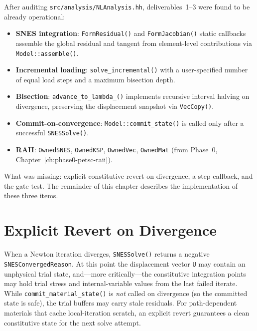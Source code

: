 After auditing \texttt{src/analysis/NLAnalysis.hh}, deliverables~1--3
were found to be already operational:

\begin{itemize}
  \item \textbf{SNES integration}: \texttt{FormResidual()} and
        \texttt{FormJacobian()} static callbacks assemble the global
        residual and tangent from element-level contributions via
        \texttt{Model::assemble()}.
  \item \textbf{Incremental loading}: \texttt{solve\_incremental()} with
        a user-specified number of equal load steps and a maximum
        bisection depth.
  \item \textbf{Bisection}: \texttt{advance\_to\_lambda\_()} implements
        recursive interval halving on divergence, preserving the
        displacement snapshot via \texttt{VecCopy()}.
  \item \textbf{Commit-on-convergence}: \texttt{Model::commit\_state()}
        is called only after a successful \texttt{SNESSolve()}.
  \item \textbf{RAII}: \texttt{OwnedSNES}, \texttt{OwnedKSP},
        \texttt{OwnedVec}, \texttt{OwnedMat} (from Phase~0,
        Chapter~\ref{ch:phase0-petsc-raii}).
\end{itemize}

What was missing: explicit constitutive revert on divergence, a step
callback, and the gate test.  The remainder of this chapter describes
the implementation of these three items.


\section{Explicit Revert on Divergence}
\label{sec:phase3-revert-on-divergence}

When a Newton iteration diverges, \texttt{SNESSolve()} returns a
negative \texttt{SNESConvergedReason}.  At this point the displacement
vector \texttt{U} may contain an unphysical trial state, and—more
critically—the constitutive integration points may hold trial stress
and internal-variable values from the last failed iterate.  While
\texttt{commit\_material\_state()} is \emph{not} called on divergence
(so the committed state is safe), the trial buffers may carry stale
residuals.  For path-dependent materials that cache local-iteration
scratch, an explicit revert guarantees a clean constitutive state for
the next solve attempt.

